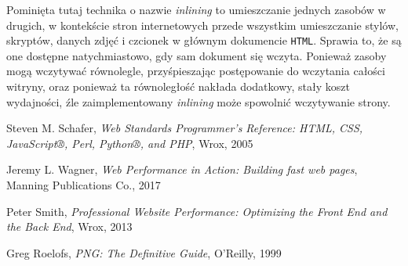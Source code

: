 \documentclass[licencjacka]{pracadypl}
\begin{document}
Pominięta tutaj technika o nazwie \emph{inlining} to umieszczanie jednych zasobów w drugich, w kontekście stron internetowych przede wszystkim umieszczanie stylów, skryptów, danych zdjęć i czcionek w głównym dokumencie \texttt{HTML}. Sprawia to, że są one dostępne natychmiastowo, gdy sam dokument się wczyta. Ponieważ zasoby mogą wczytywać równolegle, przyśpieszając postępowanie do wczytania całości witryny, oraz ponieważ ta równoległość nakłada dodatkowy, stały koszt wydajności, źle zaimplementowany \emph{inlining} może spowolnić wczytywanie strony.


\begin{thebibliography}{7}
%

Steven M. Schafer,
\textit{Web Standards Programmer's Reference: HTML, CSS, JavaScript®, Perl, Python®, and PHP},
Wrox, 2005

Jeremy L. Wagner,
\textit{Web Performance in Action: Building fast web pages},
Manning Publications Co., 2017

Peter Smith,
\textit{Professional Website Performance: Optimizing the Front End and the Back End},
Wrox, 2013

Greg Roelofs,
\textit{PNG: The Definitive Guide},
O'Reilly, 1999
\end{thebibliography}
\end{document}
